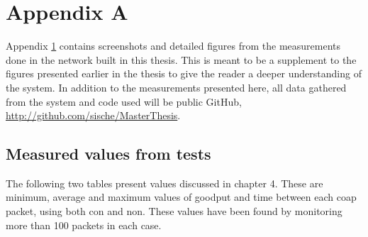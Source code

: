 \chapter{Appendix A}
\label{chp:appendixb}

\noindent Appendix \ref{chp:appendixb} contains screenshots and detailed figures from the measurements done in the network built in this thesis. This is meant to be a supplement to the figures presented earlier in the thesis to give the reader a deeper understanding of the system. In addition to the measurements presented here, all data gathered from the system and code used will be public GitHub, \url{http://github.com/sische/MasterThesis}. 

\section{Measured values from tests}

\noindent The following two tables present values discussed in chapter 4. These are minimum, average and maximum values of goodput and time between each \gls{coap} packet, using both \gls{con} and \gls{non}. These values have been found by monitoring more than 100 packets in each case. 


\newpage

